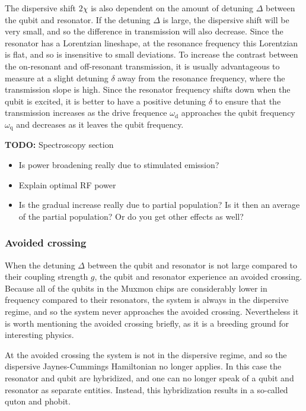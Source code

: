 \documentclass[12pt]{report}
\newcommand{\wqub}{\omega_\text{q}}
\newcommand{\wdrive}{\omega_\text{d}}
\begin{document}
          The dispersive shift $2 \chi$ is also dependent on the amount of detuning $\Delta$ between the qubit and resonator. If the detuning $\Delta$ is large, the dispersive shift will be very small, and so the difference in transmission will also decrease. Since the resonator has a Lorentzian lineshape, at the resonance frequency this Lorentzian is flat, and so is insensitive to small deviations. To increase the contrast between the on-resonant and off-resonant transmission, it is usually advantageous to measure at a slight detuning $\delta$ away from the resonance frequency, where the transmission slope is high. Since the resonator frequency shifts down when the qubit is excited, it is better to have a positive detuning $\delta$ to ensure that the transmission increases as the drive frequence $\wdrive$ approaches the qubit frequency $\wqub$ and decreases as it leaves the qubit frequency.

          \textbf{TODO:} Spectroscopy section
          \begin{itemize}
              \item Is power broadening really due to stimulated emission?
              \item Explain optimal RF power
              \item Is the gradual increase really due to partial population? Is it then an average of the partial population? Or do you get other effects as well?
          \end{itemize}


        \subsubsection{Avoided crossing}
          When the detuning $\Delta$ between the qubit and resonator is not large compared to their coupling strength $g$, the qubit and resonator experience an avoided crossing. Because all of the qubits in the Muxmon chips are considerably lower in frequency compared to their resonators, the system is always in the dispersive regime, and so the system never approaches the avoided crossing. Nevertheless it is worth mentioning the avoided crossing briefly, as it is a breeding ground for interesting physics.

          At the avoided crossing the system is not in the dispersive regime, and so the dispersive Jaynes-Cummings Hamiltonian no longer applies. In this case the resonator and qubit are hybridized, and one can no longer speak of a qubit and resonator as separate entities. Instead, this hybridization results in a so-called quton and phobit.
\end{document}
